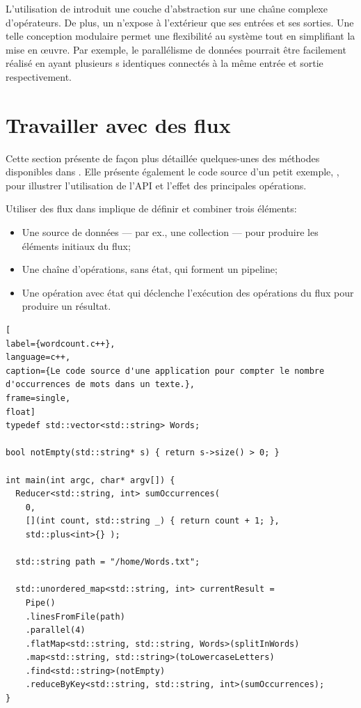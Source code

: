L'utilisation de  introduit une couche d'abstraction sur une cha\^{\i}ne complexe d'op\'erateurs. De plus, un  n'expose à l'ext\'erieur que ses entr\'ees et ses sorties. Une telle conception modulaire permet une flexibilit\'e au syst\`eme tout en simplifiant la mise en œuvre. Par exemple, le parall\'elisme de donn\'ees
pourrait \^etre facilement r\'ealis\'e en ayant plusieurs s identiques connect\'es \`a la m\^eme entr\'ee et sortie respectivement.


\section{Travailler avec des flux}

Cette section pr\'esente de fa\c{c}on plus d\'etaill\'ee quelques-unes des m\'ethodes disponibles dans \PpFf. Elle pr\'esente \'egalement le code source d'un petit exemple, , pour illustrer l'utilisation de l'API et l'effet des principales op\'erations. 

Utiliser des flux dans \PpFf{} implique de d\'efinir et combiner trois \'el\'ements: 
\begin{itemize}
	\item Une source de donn\'ees --- par ex., une collection --- pour produire les \'el\'ements initiaux du flux;

	\item Une cha\^ine d'op\'erations, sans \'etat, qui forment un pipeline;

	\item Une op\'eration avec \'etat qui d\'eclenche l'ex\'ecution des op\'erations du flux pour produire un r\'esultat.
\end{itemize}


\begin{lstlisting}[
label={wordcount.c++},
language=c++,
caption={Le code source d'une application pour compter le nombre d'occurrences de mots dans un texte.},
frame=single,
float]
typedef std::vector<std::string> Words;

bool notEmpty(std::string* s) { return s->size() > 0; }

int main(int argc, char* argv[]) {
  Reducer<std::string, int> sumOccurrences(
    0, 
    [](int count, std::string _) { return count + 1; },
    std::plus<int>{} );

  std::string path = "/home/Words.txt"; 

  std::unordered_map<std::string, int> currentResult = 
	Pipe()
    .linesFromFile(path) 
    .parallel(4)
    .flatMap<std::string, std::string, Words>(splitInWords)
    .map<std::string, std::string>(toLowercaseLetters)
    .find<std::string>(notEmpty)
    .reduceByKey<std::string, std::string, int>(sumOccurrences);
}
\end{lstlisting}




